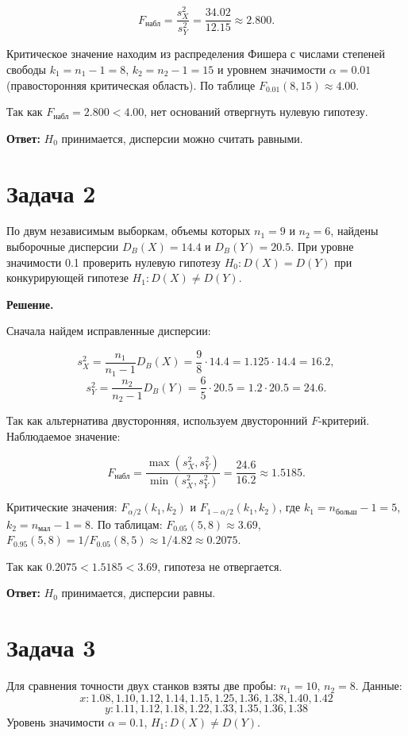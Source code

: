 \documentclass[a4paper,14pt]{article}
\begin{document}
\[
F_{\text{набл}} = \frac{s_X^2}{s_Y^2} = \frac{34.02}{12.15} \approx 2.800.
\]

Критическое значение находим из распределения Фишера с числами степеней свободы \( k_1 = n_1 - 1 = 8 \), \( k_2 = n_2 - 1 = 15 \) и уровнем значимости \( \alpha = 0.01 \) (правосторонняя критическая область). По таблице \( F_{0.01}(8, 15) \approx 4.00 \).

Так как \( F_{\text{набл}} = 2.800 < 4.00 \), нет оснований отвергнуть нулевую гипотезу.

\textbf{Ответ:} \( H_0 \) принимается, дисперсии можно считать равными.

\section*{Задача 2}
По двум независимым выборкам, объемы которых \( n_1 = 9 \) и \( n_2 = 6 \), найдены выборочные дисперсии \( D_B(X) = 14.4 \) и \( D_B(Y) = 20.5 \). При уровне значимости 0.1 проверить нулевую гипотезу \( H_0: D(X) = D(Y) \) при конкурирующей гипотезе \( H_1: D(X) \neq D(Y) \).

\textbf{Решение.}

Сначала найдем исправленные дисперсии:

\[
s_X^2 = \frac{n_1}{n_1 - 1} D_B(X) = \frac{9}{8} \cdot 14.4 = 1.125 \cdot 14.4 = 16.2,
\]
\[
s_Y^2 = \frac{n_2}{n_2 - 1} D_B(Y) = \frac{6}{5} \cdot 20.5 = 1.2 \cdot 20.5 = 24.6.
\]

Так как альтернатива двусторонняя, используем двусторонний \( F \)-критерий. Наблюдаемое значение:

\[
F_{\text{набл}} = \frac{\max(s_X^2, s_Y^2)}{\min(s_X^2, s_Y^2)} = \frac{24.6}{16.2} \approx 1.5185.
\]

Критические значения: \( F_{\alpha/2}(k_1, k_2) \) и \( F_{1-\alpha/2}(k_1, k_2) \), где \( k_1 = n_{\text{больш}} - 1 = 5 \), \( k_2 = n_{\text{мал}} - 1 = 8 \). По таблицам: \( F_{0.05}(5,8) \approx 3.69 \), \( F_{0.95}(5,8) = 1 / F_{0.05}(8,5) \approx 1/4.82 \approx 0.2075 \).

Так как \( 0.2075 < 1.5185 < 3.69 \), гипотеза не отвергается.

\textbf{Ответ:} \( H_0 \) принимается, дисперсии равны.

\section*{Задача 3}
Для сравнения точности двух станков взяты две пробы: \( n_1 = 10 \), \( n_2 = 8 \). Данные:
\[
x: 1.08, 1.10, 1.12, 1.14, 1.15, 1.25, 1.36, 1.38, 1.40, 1.42
\]
\[
y: 1.11, 1.12, 1.18, 1.22, 1.33, 1.35, 1.36, 1.38
\]
Уровень значимости \( \alpha = 0.1 \), \( H_1: D(X) \neq D(Y) \).
\end{document}
